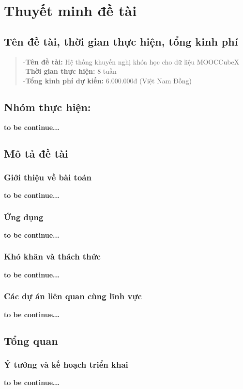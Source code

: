 \section{Thuyết minh đề tài}
\subsection{Tên đề tài, thời gian thực hiện, tổng kinh phí}
\begin{quote}
-\textbf{Tên đề tài:} Hệ thống khuyến nghị khóa học cho dữ liệu MOOCCubeX\\
-\textbf{Thời gian thực hiện:} 8 tuần \\
-\textbf{Tổng kinh phí dự kiến:} 6.000.000đ (Việt Nam Đồng)\\
\end{quote}
\subsection{Nhóm thực hiện:}
\textbf{to be continue...}\\
\subsection{Mô tả đề tài}
\subsubsection{Giới thiệu về bài toán}
\textbf{to be continue...}\\
\subsubsection{Ứng dụng}
\textbf{to be continue...}\\
\subsubsection{Khó khăn và thách thức}
\textbf{to be continue...}\\
\subsubsection{Các dự án liên quan cùng lĩnh vực}
\textbf{to be continue...}\\
\subsection{Tổng quan}
\subsubsection{Ý tưởng và kế hoạch triển khai}
\textbf{to be continue...}\\
